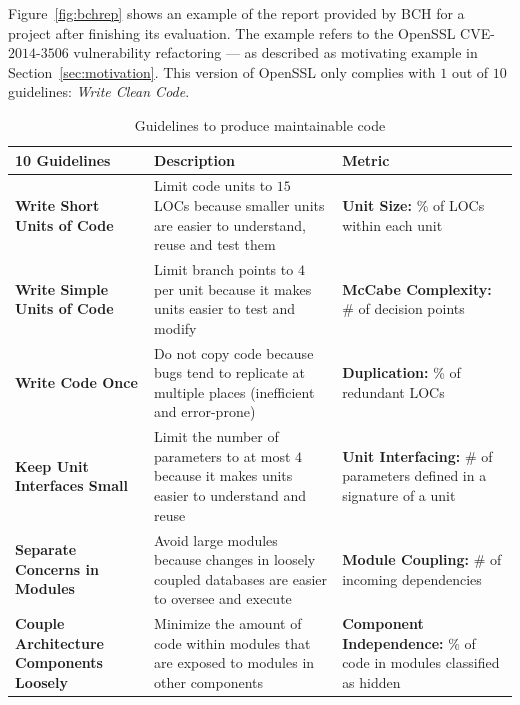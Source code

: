 \documentclass[sigconf,review]{acmart}
\begin{document}
Figure~\ref{fig:bchrep} shows an example of the report
provided by BCH for a project after finishing its evaluation. The example
refers to the OpenSSL CVE-$2014$-$3506$ vulnerability refactoring ---
as described as motivating example in Section~\ref{sec:motivation}. This
version of OpenSSL only complies with $1$ out of $10$ guidelines: \emph{Write
Clean Code}.

\begin{table}[h]
	\caption{Guidelines to produce maintainable code}
\begin{tabular}{L{1.66cm}L{3.25cm}L{2.65cm}}

\toprule
\textbf{10 Guidelines} & \textbf{Description} & \textbf{Metric}\\
\midrule

\textbf{Write Short Units of Code} & Limit code units to $15$ LOCs because smaller
 units are easier to understand, reuse and test them & \textbf{Unit Size:} \% of 
 LOCs within each unit~\cite{criteria:2017} \\\midrule

\textbf{Write Simple Units of Code} & Limit branch points to $4$ per unit because
it makes units easier to test and modify & \textbf{McCabe Complexity:} \# of decision 
points~\cite{1702388,criteria:2017}\\\midrule

\textbf{Write Code Once} & Do not copy code because bugs tend to replicate at
multiple places (inefficient and error-prone) & \textbf{Duplication:} \% of redundant 
LOCs~\cite{criteria:2017}\\\midrule

\textbf{Keep Unit Interfaces Small} & Limit the number of parameters to at most
$4$ because it makes units easier to understand and reuse & \textbf{Unit Interfacing:} 
\# of parameters defined in a signature of a unit~\cite{criteria:2017} \\\midrule

\textbf{Separate Concerns in Modules} & Avoid large modules because changes in
loosely coupled databases are easier to oversee and execute & \textbf{Module Coupling:} \# of
incoming dependencies~\cite{criteria:2017} \\\midrule

\textbf{Couple Architecture Components Loosely} & Minimize the amount of code
within modules that are exposed to modules in other components & \textbf{Component Independence:} 
\% of code in modules classified as hidden~\cite{criteria:2017}\\\midrule


\end{tabular}
\end{table}
\end{document}
